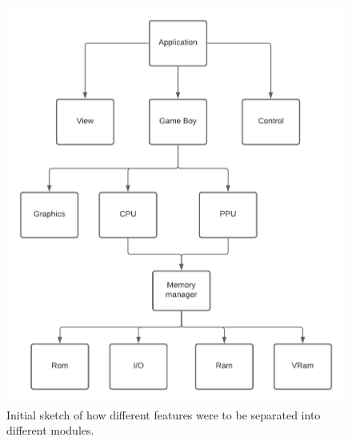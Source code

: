 \begin{figure}[H]
    \centering
    \includegraphics[scale=0.7]{figures/Gameboy Domain model.png}
    \caption{Initial sketch of how different features were to be separated into different modules.}
    \label{fig:initial_domain_model}
\end{figure}


